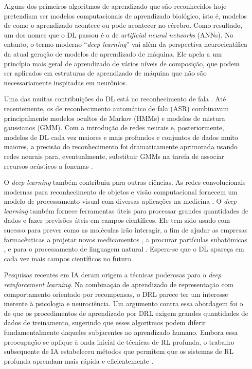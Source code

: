 Alguns dos primeiros algoritmos de aprendizado que são reconhecidos hoje pretendiam ser modelos computacionais de aprendizado biológico, isto é, modelos de como o aprendizado acontece ou pode acontecer no cérebro. Como resultado, um dos nomes que o DL passou é o de \textit{artificial neural networks} (ANNs). No entanto, o termo moderno ``\textit{deep learning}'' vai além da perspectiva neurocientífica da atual geração de modelos de aprendizado de máquina. Ele apela a um princípio mais geral de aprendizado de vários níveis de composição, que podem ser aplicados em estruturas de aprendizado de máquina que não são necessariamente inspiradas em neurônios.


Uma das muitas contribuições do DL está no reconhecimento de fala \cite{nassif:speech-rec:2019}. Até recentemente, os de reconhecimento automático de fala (ASR) combinavam principalmente modelos ocultos de Markov (HMMs) e modelos de mistura gaussianos (GMM). Com a introdução de redes neurais e, posteriormente, modelos de DL cada vez maiores e mais profundos e conjuntos de dados muito maiores, a precisão do reconhecimento foi dramaticamente aprimorada usando redes neurais para, eventualmente, substituir GMMs na tarefa de associar recursos acústicos a fonemas \cite{Goodfellow-et-al-2016}.


O \textit{deep learning} também contribuiu para outras ciências. As redes convolucionais modernas para reconhecimento de objetos e visão computacional fornecem um modelo de processamento visual com diversas aplicações na medicina \cite{Yeung:comp-vis:2019,dicarlo-afrax-yamins:2014}. O \textit{deep learning} também fornece ferramentas úteis para processar grandes quantidades de dados e fazer previsões úteis em campos científicos. Ele tem sido usado com sucesso para prever como as moléculas irão interagir, a fim de ajudar as empresas farmacêuticas a projetar novos medicamentos \cite{dahl2014multitask}, a procurar partículas subatômicas \cite{baldi:s:w:2015}, e para o processamento de linguagem natural \cite{Young_2018}. Espera-se que o DL apareça em cada vez mais campos científicos no futuro.

Pesquisas recentes em IA deram origem a técnicas poderosas para o \textit{deep reinforcement learning}. 
Na combinação de aprendizado de representação com comportamento orientado por recompensas, o DRL parece ter um interesse inerente à psicologia e neurociência. 
Um argumento contra essa abordagem foi o de que os procedimentos de aprendizado por DRL exigem grandes quantidades de dados de treinamento, sugerindo que esses algoritmos podem diferir fundamentalmente daqueles subjacentes ao aprendizado humano. 
Embora essa preocupação se aplique à onda inicial de técnicas de RL profunda, o trabalho subsequente de IA estabeleceu métodos que permitem que os sistemas de RL profunda aprendam mais rápida e eficientemente \cite{Botvinick:rl-fastandslow:2019}.


